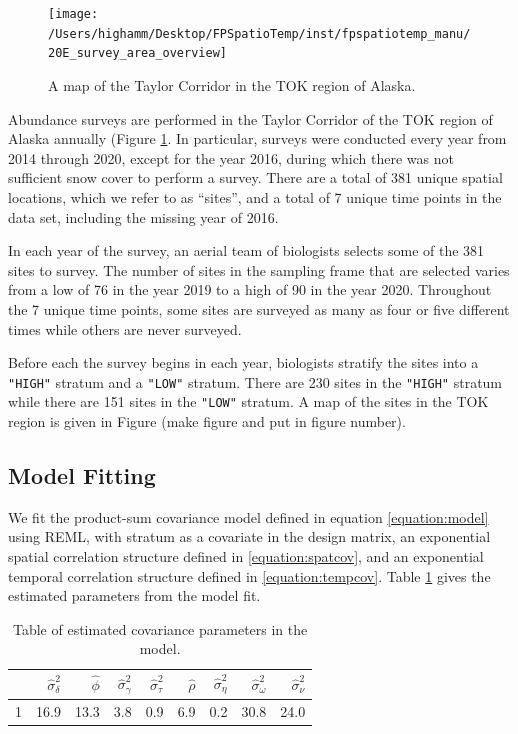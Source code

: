 \documentclass[]{interact}
\theoremstyle{plain}%
\theoremstyle{definition}
\theoremstyle{remark}
\begin{document}
\begin{figure}
\texttt{[image: /Users/highamm/Desktop/FPSpatioTemp/inst/fpspatiotemp\_manu/20E\_survey\_area\_overview]} \caption{\label{fig:tokplot} A map of the Taylor Corridor in the TOK region of Alaska.}\label{fig:tokplot}
\end{figure}

Abundance surveys are performed in the Taylor Corridor of the TOK region
of Alaska annually (Figure \ref{fig:tokplot}. In particular, surveys
were conducted every year from 2014 through 2020, except for the year
2016, during which there was not sufficient snow cover to perform a
survey. There are a total of 381 unique spatial locations, which we
refer to as ``sites'', and a total of 7 unique time points in the data
set, including the missing year of 2016.

In each year of the survey, an aerial team of biologists selects some of
the 381 sites to survey. The number of sites in the sampling frame that
are selected varies from a low of 76 in the year 2019 to a high of 90 in
the year 2020. Throughout the 7 unique time points, some sites are
surveyed as many as four or five different times while others are never
surveyed.

Before each the survey begins in each year, biologists stratify the
sites into a \texttt{"HIGH"} stratum and a \texttt{"LOW"} stratum. There
are 230 sites in the \texttt{"HIGH"} stratum while there are 151 sites
in the \texttt{"LOW"} stratum. A map of the sites in the TOK region is
given in Figure (make figure and put in figure number).

\subsection{Model Fitting}

We fit the product-sum covariance model defined in equation
\ref{equation:model} using REML, with stratum as a covariate in the
design matrix, an exponential spatial correlation structure defined in
\ref{equation:spatcov}, and an exponential temporal correlation
structure defined in \ref{equation:tempcov}. Table \ref{paramest} gives
the estimated parameters from the model fit.

\begin{table}[ht]
\centering
\begin{tabular}{rrrrrrrrr}
  \hline
 & $\hat{\sigma}^2_{\delta}$ & $\hat{\phi}$ & $\hat{\sigma}^2_{\gamma}$ & $\hat{\sigma}^2_{\tau}$ & $\hat{\rho}$ & $\hat{\sigma}^2_{\eta}$ & $\hat{\sigma}^2_{\omega}$ & $\hat{\sigma}^2_{\nu}$ \\ 
  \hline
1 & 16.9 & 13.3 & 3.8 & 0.9 & 6.9 & 0.2 & 30.8 & 24.0 \\ 
   \hline
\end{tabular}
\caption{Table of estimated covariance parameters in the model.} 
\label{paramest}
\end{table}
\end{document}
